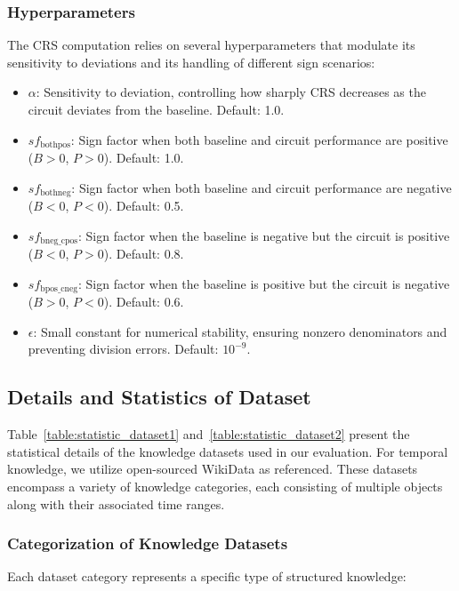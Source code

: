\subsubsection{Hyperparameters}
The CRS computation relies on several hyperparameters that modulate its sensitivity to deviations and its handling of different sign scenarios:
\begin{itemize}
    \item $\alpha$: Sensitivity to deviation, controlling how sharply CRS decreases as the circuit deviates from the baseline. Default: 1.0.
    \item $sf_{\text{bothpos}}$: Sign factor when both baseline and circuit performance are positive ($B > 0$, $P > 0$). Default: 1.0.
    \item $sf_{\text{bothneg}}$: Sign factor when both baseline and circuit performance are negative ($B < 0$, $P < 0$). Default: 0.5.
    \item $sf_{\text{bneg\_cpos}}$: Sign factor when the baseline is negative but the circuit is positive ($B < 0$, $P > 0$). Default: 0.8.
    \item $sf_{\text{bpos\_cneg}}$: Sign factor when the baseline is positive but the circuit is negative ($B > 0$, $P < 0$). Default: 0.6.
    \item $\epsilon$: Small constant for numerical stability, ensuring nonzero denominators and preventing division errors. Default: $10^{-9}$.
\end{itemize}

\subsection{Details and Statistics of Dataset}
\label{sec:dataset_details}
Table~\ref{table:statistic_dataset1} and~\ref{table:statistic_dataset2} present the statistical details of the knowledge datasets used in our evaluation. 
For temporal knowledge, we utilize open-sourced WikiData as referenced. 
These datasets encompass a variety of knowledge categories, each consisting of multiple objects along with their associated time ranges.

\subsubsection{Categorization of Knowledge Datasets}
Each dataset category represents a specific type of structured knowledge:

